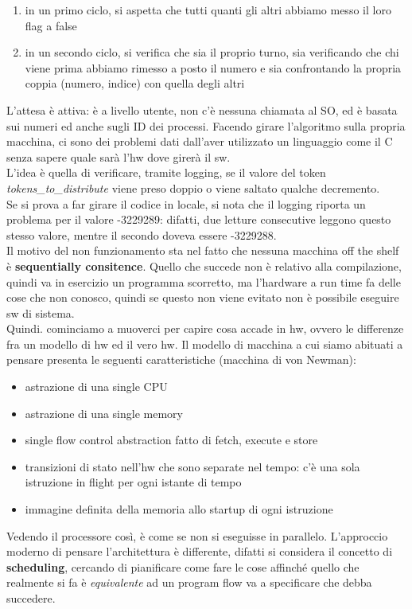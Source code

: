 \documentclass[12pt, oneside]{extbook}
\begin{document}
\begin{enumerate}
\item in un primo ciclo, si aspetta che tutti quanti gli altri abbiamo messo il loro flag a false
\item in un secondo ciclo, si verifica che sia il proprio turno, sia verificando che chi viene prima abbiamo rimesso a posto il numero e sia confrontando la propria coppia (numero, indice) con quella degli altri
\end{enumerate} L'attesa è attiva: è a livello utente, non c'è nessuna chiamata al SO, ed è basata sui numeri ed anche sugli ID dei processi. Facendo girare l'algoritmo sulla propria macchina, ci sono dei problemi dati dall'aver utilizzato un linguaggio come il C senza sapere quale sarà l'hw dove girerà il sw. \\ L'idea è quella di verificare, tramite logging, se il valore del token \textit{tokens\_to\_distribute} viene preso doppio o viene saltato qualche decremento.\\ Se si prova a far girare il codice in locale, si nota che il logging riporta un problema per il valore -3229289: difatti, due letture consecutive leggono questo stesso valore, mentre il secondo doveva essere -3229288.\\ Il motivo del non funzionamento sta nel fatto che nessuna macchina off the shelf è \textbf{sequentially consitence}. Quello che succede non è relativo alla compilazione, quindi va in esercizio un programma scorretto, ma l'hardware a run time fa delle cose che non conosco, quindi se questo non viene evitato non è possibile eseguire sw di sistema.\\ Quindi. cominciamo a muoverci per capire cosa accade in hw, ovvero le differenze fra un modello di hw ed il vero hw. Il modello di macchina a cui siamo abituati a pensare presenta le seguenti caratteristiche (macchina di von Newman):
\begin{itemize}
\item astrazione di una single CPU
\item astrazione di una single memory
\item single flow control abstraction fatto di fetch, execute e store
\item transizioni di stato nell'hw che sono separate nel tempo: c'è una sola istruzione in flight per ogni istante di tempo
\item immagine definita della memoria allo startup di ogni istruzione
\end{itemize}
Vedendo il processore così, è come se non si eseguisse in parallelo. L'approccio moderno di pensare l'architettura è differente, difatti si considera il concetto di \textbf{scheduling}, cercando di pianificare come fare le cose affinché quello che realmente si fa è \textit{equivalente} ad un program flow va a specificare che debba succedere.
\end{document}
